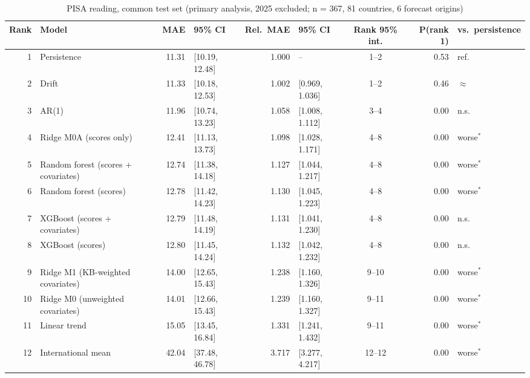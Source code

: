 \begin{table}[htbp]
\centering
\footnotesize
\caption{PISA reading, common test set (primary analysis, 2025 excluded; n = 367, 81 countries, 6 forecast origins)}
\label{tab:A3}
\begin{tabular}{rlrlrlcrl}
\toprule
Rank & Model & MAE & 95\% CI & Rel.\ MAE & 95\% CI & Rank 95\% int. & P(rank 1) & vs.\ persistence \\
\midrule
1 & Persistence & 11.31 & [10.19, 12.48] & 1.000 & -- & 1--2 & 0.53 & ref. \\
2 & Drift & 11.33 & [10.18, 12.53] & 1.002 & [0.969, 1.036] & 1--2 & 0.46 & $\approx$ \\
3 & AR(1) & 11.96 & [10.74, 13.23] & 1.058 & [1.008, 1.112] & 3--4 & 0.00 & n.s. \\
4 & Ridge M0A (scores only) & 12.41 & [11.13, 13.73] & 1.098 & [1.028, 1.171] & 4--8 & 0.00 & worse$^{*}$ \\
5 & Random forest (scores + covariates) & 12.74 & [11.38, 14.18] & 1.127 & [1.044, 1.217] & 4--8 & 0.00 & worse$^{*}$ \\
6 & Random forest (scores) & 12.78 & [11.42, 14.23] & 1.130 & [1.045, 1.223] & 4--8 & 0.00 & worse$^{*}$ \\
7 & XGBoost (scores + covariates) & 12.79 & [11.48, 14.19] & 1.131 & [1.041, 1.230] & 4--8 & 0.00 & n.s. \\
8 & XGBoost (scores) & 12.80 & [11.45, 14.24] & 1.132 & [1.042, 1.232] & 4--8 & 0.00 & n.s. \\
9 & Ridge M1 (KB-weighted covariates) & 14.00 & [12.65, 15.43] & 1.238 & [1.160, 1.326] & 9--10 & 0.00 & worse$^{*}$ \\
10 & Ridge M0 (unweighted covariates) & 14.01 & [12.66, 15.43] & 1.239 & [1.160, 1.327] & 9--11 & 0.00 & worse$^{*}$ \\
11 & Linear trend & 15.05 & [13.45, 16.84] & 1.331 & [1.241, 1.432] & 9--11 & 0.00 & worse$^{*}$ \\
12 & International mean & 42.04 & [37.48, 46.78] & 3.717 & [3.277, 4.217] & 12--12 & 0.00 & worse$^{*}$ \\
\bottomrule
\end{tabular}
\par{}
\end{table}
